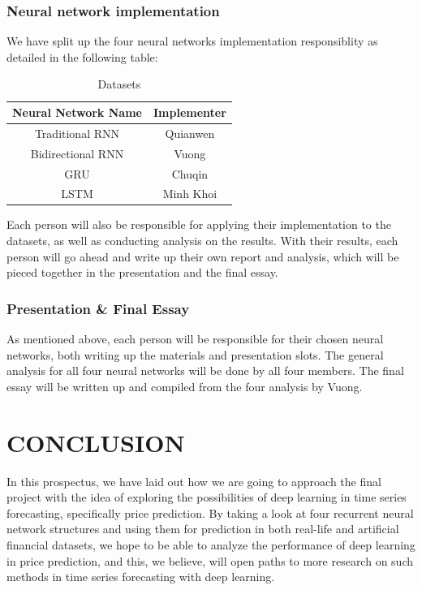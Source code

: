 \documentclass[letterpaper, 10 pt, conference]{ieeeconf}  %
\begin{document}
    \subsubsection{Neural network implementation} We have split up the four neural networks implementation responsiblity as detailed in the following table:
    \begin{table}[h!] \centering
        \caption{Datasets }
        \begin{threeparttable}
                \begin{tabular}{|c|c|}
                    \hline
                    Neural Network Name & Implementer\\
                    \hline
                    Traditional RNN & Quianwen\\
                    Bidirectional RNN & Vuong\\
                    GRU & Chuqin\\
                    LSTM & Minh Khoi\\
                    \hline
                \end{tabular}
        \end{threeparttable}
    \end{table}

    Each person will also be responsible for applying their implementation to the datasets, as well as conducting analysis on the results. With their results, each person will go ahead and write up their own report and analysis, which will be pieced together in the presentation and the final essay.

    \subsubsection{Presentation \& Final Essay} As mentioned above, each person will be responsible for their chosen neural networks, both writing up the materials and presentation slots. The general analysis for all four neural networks will be done by all four members. The final essay will be written up and compiled from the four analysis by Vuong.

\section{CONCLUSION}
    In this prospectus, we have laid out how we are going to approach the final project with the idea of exploring the possibilities of deep learning in time series forecasting, specifically price prediction. By taking a look at four recurrent neural network structures and using them for prediction in both real-life and artificial financial datasets, we hope to be able to analyze the performance of deep learning in price prediction, and this, we believe, will open paths to more research on such methods in time series forecasting with deep learning. 
\end{document}
